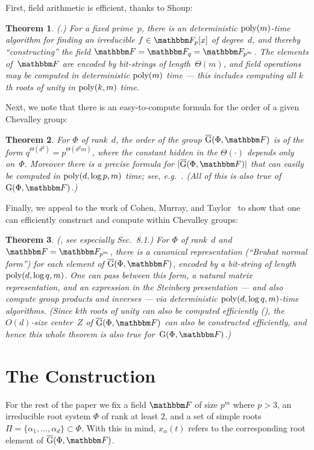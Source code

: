 \documentclass[10pt,a4paper]{article}
\newtheorem{theorem}{Theorem}[section]
\theoremstyle{definition}
\newcommand{\poly}{\textnormal{poly}}
\newcommand{\F}{\mathbbm F}
\newcommand{\ol}[1]{\overline{#1}}
\DeclarePairedDelimiter\abs{\lvert}{\rvert}
\newcommand{\Esc}[2]{\ol{\mathrm{G}}(#1,#2)}
\newcommand{\Gu}[2]{\ol{\mathrm{G}}(#1,#2)}
\newcommand{\Gad}[2]{\mathrm{G}(#1,#2)}
\begin{document}
First, field arithmetic is efficient, thanks to Shoup:
\begin{theorem}                                     \label{thm:fields}
    \textnormal{(\cite{Sho90}.)}
    For a fixed prime~$p$, there is an deterministic $\poly(m)$-time algorithm for finding an irreducible $f \in \F_p[x]$ of degree~$d$, and thereby ``constructing'' the field $\F = \F_q = \F_{p^m}$.
    The elements of~$\F$ are encoded by bit-strings of length~$\Theta(m)$, and field operations may be computed in deterministic $\poly(m)$ time --- this includes computing all $k$th roots of unity in $\poly(k,m)$ time.
\end{theorem}

Next, we note that there is an easy-to-compute formula for the order of a given Chevalley group:
\begin{theorem}                                     \label{thm:order}
    For $\Phi$ of rank~$d$, the order of the group $\Gu{\Phi}{\F}$ is of the form $q^{\Theta(d^2)} = p^{\Theta(d^2 m)}$, where the constant hidden in the $\Theta(\cdot)$ depends only on~$\Phi$.
    Moreover there is a precise formula for $\abs{\Gu{\Phi}{\F}}$ that can easily be computed in $\poly(d, \log p, m)$ time; see, e.g.~\cite[Thm.~25]{Ste16}.
    (All of this is also true of  $\Gad{\Phi}{\F}$.)
\end{theorem}

Finally, we appeal to the work of Cohen, Murray, and Taylor~\cite{CMT04} to show that one can efficiently construct and compute within Chevalley groups:
\begin{theorem}                                     \label{thm:computing}
    \textnormal{(\cite{CMT04}, see especially Sec.~8.1.)}
     For $\Phi$ of rank~$d$ and $\F = \F_{p^m}$, there is a canonical representation (``Bruhat normal form'') for each element of $\Gu{\Phi}{\F}$, encoded by a bit-string of length $\poly(d, \log q, m)$.  One can pass between this form, a natural matrix representation, and an expression in the Steinberg presentation --- and also compute group products and inverses --- via deterministic $\poly(d, \log q, m)$-time algorithms.
     (Since $k$th roots of unity can also be computed efficiently (), the $O(d)$-size center~$Z$ of $\Gu{\Phi}{\F}$ can also be constructed efficiently, and hence this whole theorem is also true for~$\Gad{\Phi}{\F}$.)
\end{theorem}


\section{The Construction}\label{sec:construct}
For the rest of the paper we fix a field $\F$ of size $p^m$ where $p > 3$, an irreducible root system $\Phi$ of rank at least $2$, and a set of simple roots $\Pi = \{\alpha_1, \dots, \alpha_d\} \subset \Phi$. With this in mind, $x_\alpha(t)$ refers to the corresponding root element of $\Esc{\Phi}{\F}$.
\end{document}
